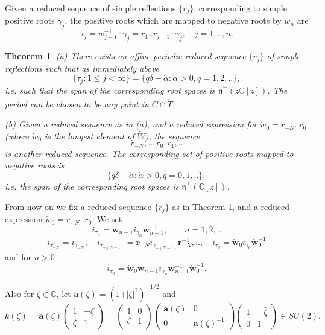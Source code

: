 \documentclass{amsart}
\newtheorem{theorem}{Theorem}[section]
\theoremstyle{conjecture}
\theoremstyle{definition}
\theoremstyle{question}
\theoremstyle{questions}
\theoremstyle{remark}
\theoremstyle{remarks}
\theoremstyle{example}
\numberwithin{equation}{section}
\begin{document}
Given a reduced sequence of simple
reflections $\{r_j\}$, corresponding to simple positive roots
$\gamma_j$, the positive roots which are mapped to negative roots by $w_n$
are
$$\tau_j=w_{j-1}^{-1}\cdot\gamma_j=r_1..r_{j-1}\cdot\gamma_j,\quad j=1,..,n.$$



\begin{theorem}\label{periodic}(a) There exists an affine
periodic reduced sequence $\{r_j\}$ of simple reflections such
that as immediately above
\begin{equation}\label{flips}\{\tau_j:1\le j<\infty\}=\{q \delta -\dot{\alpha
}:\dot{\alpha }>0,q=1,2,..\},\end{equation} i.e. such that the
span of the corresponding root spaces is $\dot{\mathfrak
n}^{-}(z\mathbb C[z])$. The period can be chosen to be any point
in $C \cap \check{\dot T}$.

(b) Given a reduced sequence as in (a), and a reduced expression
for $\dot {w}_0=r_{-N}..r_0$ (where $\dot w_0$ is the longest
element of $\dot W$), the sequence
$$r_{-N},..,r_0,r_1,..$$
is another reduced sequence. The corresponding set of positive
roots mapped to negative roots is
$$\{q \delta +\dot{\alpha }:\dot{\alpha }>0,q=0,1,..\}
,$$ i.e. the span of the corresponding root spaces is $\dot
{\mathfrak n}^{+}(\mathbb C[z])$.

\end{theorem}


From now on we fix a reduced
sequence $\{r_j\}$ as in Theorem \ref{periodic}, and a reduced
expression $\dot w_0=r_{-N}..r_0$.
We set
$$i_{\tau_n}=\mathbf w_{n-1} i_{\gamma_n} \mathbf
w_{n-1}^{-1}, \qquad n=1,2,..$$
$$i_{\tau_{-N}^{\prime}}=i_{\gamma_{-N}},\quad
i_{\tau_{-(N-1)}^{\prime}}=\mathbf
r_{-N}i_{\gamma_{-(N-1)}}\mathbf r_{-N}^{-1},..,\quad
i_{\tau_0^{\prime}}=\dot{\mathbf w}_0 i_{\gamma_0} \dot{\mathbf
w}_0^{-1}
$$ and for $n>0$
$$i_{\tau_n^{\prime}}=\dot{\mathbf w}_0 \mathbf w_{n-1}
i_{\gamma_n} \mathbf w_{n-1}^{-1} \dot{\mathbf w}_0^{-1}.$$

Also for $\zeta\in \mathbb C$, let $\mathbf
a(\zeta)=(1+\vert\zeta\vert^2)^{-1/2}$ and
\begin{equation}\label{kfactor}k(\zeta)=\mathbf a(\zeta)\left (
\begin{matrix}1&-\bar{\zeta}\\\zeta&1
\end{matrix}\right)=\left ( \begin{matrix}1&0\\\zeta&1
\end{matrix}\right)\left ( \begin{matrix}\mathbf a(\zeta)&0\\0&\mathbf a(\zeta)^{-1}
\end{matrix}\right)\left ( \begin{matrix}1&-\bar{\zeta}\\0&1
\end{matrix}\right) \in SU(2).\end{equation}
\end{document}

